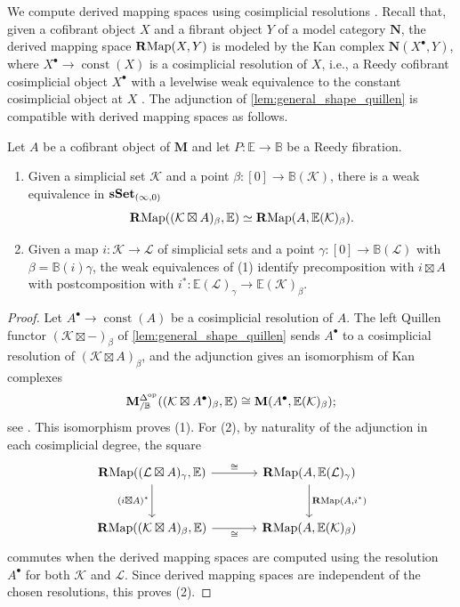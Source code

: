 \documentclass[10pt,reqno]{amsart}
\begin{document}
We compute derived mapping spaces using cosimplicial resolutions
\cite[Definition~17.1.1 and Theorem~17.4.14]{hirschhorn2003model}.
Recall that, given a cofibrant object $X$ and a fibrant object $Y$
of a model category $\mathbf N$, the derived mapping space
$\mathbf{R}\mathrm{Map}(X,Y)$ is modeled by the Kan complex
$\mathbf N(X^\bullet,Y)$, where
$X^\bullet\to\operatorname{const}(X)$ is a cosimplicial resolution
of $X$, i.e., a Reedy cofibrant cosimplicial object $X^\bullet$
with a levelwise weak equivalence to the constant cosimplicial object
at $X$ \cite[Definition~16.1.2\textup{(1)} and
Proposition~17.1.3]{hirschhorn2003model}. The adjunction of
\cref{lem:general_shape_quillen} is compatible with derived mapping
spaces as follows.
\begin{lemma}
\label{lem:derived_shape_adjunction}
Let $A$ be a cofibrant object of $\mathbf M$ and let
$P:\mathbb E\to\mathbb B$ be a Reedy fibration.
\begin{enumerate}[label=(\arabic*)]
\item Given a simplicial set $\mathcal K$ and a point
$\beta:[0]\to\mathbb B(\mathcal K)$, there is a weak equivalence
in $\mathbf{sSet}_{(\infty,0)}$
\[
\mathbf{R}\mathrm{Map}((\mathcal K\boxtimes A)_\beta,\mathbb E)
\simeq\mathbf{R}\mathrm{Map}(A,\mathbb E(\mathcal K)_\beta).
\]
\item Given a map $i:\mathcal K\to\mathcal L$ of simplicial sets and
a point $\gamma:[0]\to\mathbb B(\mathcal L)$ with
$\beta=\mathbb B(i)\gamma$, the weak equivalences of \textup{(1)}
identify precomposition with $i\boxtimes A$ with postcomposition
with
$i^*:\mathbb E(\mathcal L)_\gamma\to\mathbb E(\mathcal K)_\beta$.
\end{enumerate}
\end{lemma}
\begin{proof}
Let $A^\bullet\to\operatorname{const}(A)$ be a cosimplicial
resolution of $A$. The left Quillen functor
$(\mathcal K\boxtimes-)_\beta$ of \cref{lem:general_shape_quillen}
sends $A^\bullet$ to a cosimplicial resolution of
$(\mathcal K\boxtimes A)_\beta$, and the adjunction gives an
isomorphism of Kan complexes
\[
\mathbf M^{\Delta^{\mathrm{op}}}_{/\mathbb B}
 ((\mathcal K\boxtimes A^\bullet)_\beta,\mathbb E)
\cong
\mathbf M(A^\bullet,\mathbb E(\mathcal K)_\beta);
\]
see \cite[Proposition~17.4.16\textup{(1)}]{hirschhorn2003model}. This
isomorphism proves \textup{(1)}. For \textup{(2)}, by naturality of
the adjunction in each cosimplicial degree, the square
\[
\begin{tikzcd}[ampersand replacement=\&, sep=large]
\RMap((\mathcal L\boxtimes A)_\gamma,\mathbb E)
  \arrow[r,"\cong"]\arrow[d,"(i\boxtimes A)^*"']
\&
\RMap(A,\mathbb E(\mathcal L)_\gamma)
  \arrow[d,"{\RMap(A,i^*)}"]\\
\RMap((\mathcal K\boxtimes A)_\beta,\mathbb E)
  \arrow[r,"\cong"']
\&\RMap(A,\mathbb E(\mathcal K)_\beta)
\end{tikzcd}
\]
commutes when the derived mapping spaces are computed using the
resolution $A^\bullet$ for both $\mathcal K$ and $\mathcal L$.
Since derived mapping spaces are independent of the chosen
resolutions, this proves \textup{(2)}.
\end{proof}
\end{document}
